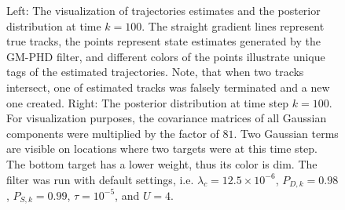 \begin{figure}
  \caption[(C1). Trajectories estimations and the posterior intensity.]{Left: The visualization of trajectories estimates and the posterior distribution at time $k=100$. The straight gradient lines represent true tracks, the points represent state estimates generated by the GM-PHD filter, and different colors of the points illustrate unique tags of the estimated trajectories. Note, that when two tracks intersect, one of estimated tracks was falsely terminated and a new one created. Right: The posterior distribution at time step $k=100$. For visualization purposes, the covariance matrices of all Gaussian components were multiplied by the factor of $81$. Two Gaussian terms are visible on locations where two targets were at this time step. The bottom target has a lower weight, thus its color is dim. The filter was run with default settings, i.e. $\lambda_{c} = 12.5 \times 10^{-6}$, $P_{D,k} = 0.98$, $P_{S,k} = 0.99$, $\tau = 10^{-5}$, and $U=4$.}
  \label{fig:c1-traj-post}
\end{figure}
